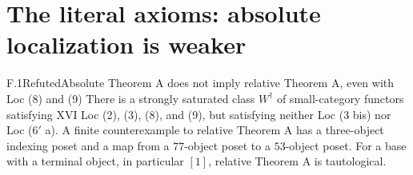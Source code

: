 \section{The literal axioms: absolute localization is weaker}
\providecommand{\Tor}{\operatorname{Tor}}
\providecommand{\Wt}{{W^{\dagger}}}
\providecommand{\PiOne}{\Pi_1}

\begin{claim}{F.1}{Refuted}{Absolute Theorem A does not imply relative Theorem A, even with Loc (8) and (9)}
There is a strongly saturated class $\Wt$ of small-category functors satisfying XVI Loc (2), (3), (8), and (9), but satisfying neither Loc (3 bis) nor Loc ($6'$ a). A finite counterexample to relative Theorem A has a three-object indexing poset and a map from a $77$-object poset to a $53$-object poset. For a base with a terminal object, in particular $[1]$, relative Theorem A is tautological.
\end{claim}
